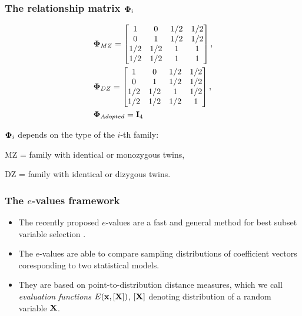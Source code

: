 \documentclass[handout,10pt]{beamer}
\begin{document}
\begin{frame}
\frametitle{The relationship matrix ${\boldsymbol{\Phi}}_i$}
%
\begin{minipage}{.63\textwidth}
%
\begin{align*}
& \bfPhi_{MZ} = \begin{bmatrix}
1 & 0 & 1/2 & 1/2 \\
0 & 1 & 1/2 & 1/2 \\
1/2 & 1/2 & 1 & 1\\
1/2 & 1/2 & 1 & 1
\end{bmatrix},\\
& \bfPhi_{DZ} = \begin{bmatrix}
1 & 0 & 1/2 & 1/2 \\
0 & 1 & 1/2 & 1/2 \\
1/2 & 1/2 & 1 & 1/2\\
1/2 & 1/2 & 1/2 & 1
\end{bmatrix},\vspace{1em}
\\
& \bfPhi_{Adopted} = \bfI_4
\end{align*}
%
\end{minipage}
%
\begin{minipage}{.34\textwidth}
${\boldsymbol{\Phi}}_i$ depends on the type of the $i$-th family:

\vspace{1em}

MZ = family with identical or monozygous twins,

DZ = family with identical or dizygous twins.

\end{minipage}

\end{frame}


\begin{frame}
\frametitle{The $e$-values framework}

\begin{itemize}
\item The recently proposed $e$-values are a fast and general method for best subset variable selection \citep{MajumdarChatterjee17}.

\item The $e$-values are able to compare sampling distributions of coefficient vectors coresponding to two statistical models.

\item They are based on point-to-distribution distance measures, which we call {\it evaluation functions} $E({\bf{x}}, [{\mathbf{X}}])$, $[{\mathbf{X}}]$ denoting distribution of a random variable ${\mathbf{X}}$.
\end{itemize}
\end{frame}
\end{document}
